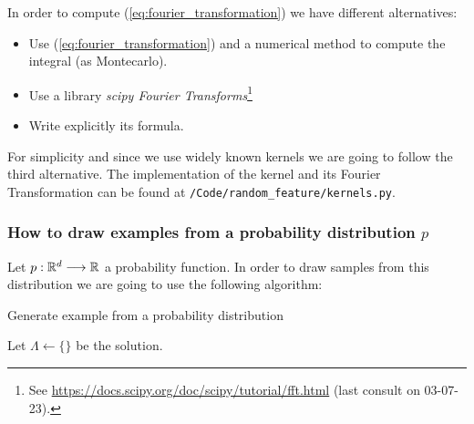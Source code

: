 In order to compute (\ref{eq:fourier_transformation})
we have different alternatives: 

\begin{itemize}
    \item Use (\ref{eq:fourier_transformation}) and a numerical method to compute the integral (as Montecarlo). 
    \item Use a library \textit{scipy Fourier Transforms}\footnote{
        See \url{https://docs.scipy.org/doc/scipy/tutorial/fft.html} (last consult on 03-07-23).
    }
    \item Write explicitly its formula. 
\end{itemize}

For simplicity and since we use widely known kernels we are going to follow the third alternative. 
The implementation of the kernel and its Fourier Transformation can be found at \texttt{/Code/random\_feature/kernels.py}. 

\subsubsection{How to draw examples from a probability distribution $p$}

Let $p : \mathbb{R}^d \longrightarrow \mathbb{R}$ a probability function. In order to draw samples from this distribution 
we are going to use the following algorithm: 



\begin{algorithm}[hbt!]
    \caption{Generate example from a probability distribution }\label{alg:two}
  
        Let $\Lambda \gets \{\}$ be the solution. 
        \\
        \Return{$\Lambda$} 
    \end{algorithm}

